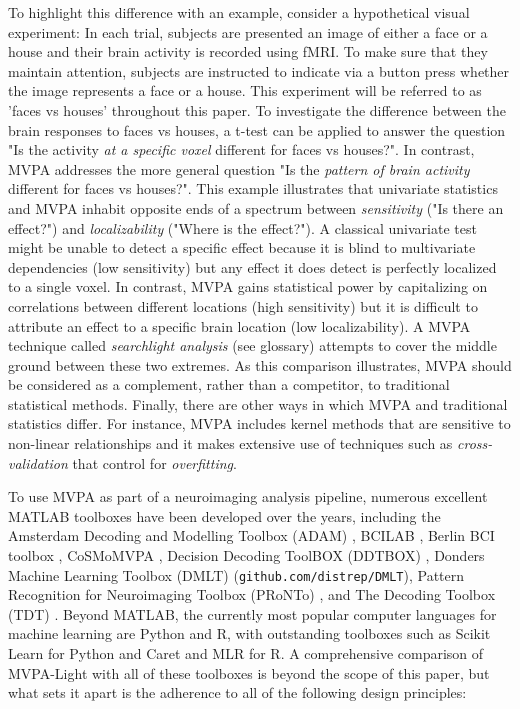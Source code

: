 \documentclass[utf8]{frontiersSCNS} %
\begin{document}
To highlight this difference with an example, consider a hypothetical visual experiment: In each trial, subjects are presented an image of either a face or a house and their brain activity is recorded using fMRI. To make sure that they maintain attention, subjects are instructed to indicate via a button press whether the image represents a face or a house. This experiment will be referred to as 'faces vs houses' throughout this paper.
To investigate the difference between the brain responses to faces vs houses, a t-test can be applied to answer the question "Is the activity \textit{at a specific voxel} different for faces vs houses?". In contrast, MVPA addresses the more general question "Is the \textit{pattern of brain activity} different for faces vs houses?". This example illustrates that univariate statistics and MVPA inhabit opposite ends of a spectrum between \textit{sensitivity} ("Is there an effect?") and \textit{localizability} ("Where is the effect?"). A classical univariate test might be unable to detect a specific effect because it is blind to multivariate dependencies (low sensitivity) but any effect it does detect is perfectly localized to a single voxel. In contrast, MVPA gains statistical power by capitalizing on correlations between different locations (high sensitivity) but it is difficult to attribute an effect to a specific brain location (low localizability). A MVPA technique called \textit{searchlight analysis} (see glossary) attempts to cover the middle ground between these two extremes. As this comparison illustrates, MVPA should be considered as a complement, rather than a competitor, to traditional statistical methods. Finally, there are other ways in which MVPA and traditional statistics differ. For instance, MVPA includes kernel methods that are sensitive to non-linear relationships and it makes extensive use of techniques such as \textit{cross-validation} that control for \textit{overfitting}.

To use MVPA as part of a neuroimaging analysis pipeline, numerous excellent MATLAB toolboxes have been developed over the years, including the Amsterdam Decoding and Modelling Toolbox (ADAM) \citep{Fahrenfort2018FromADAM}, BCILAB \citep{Kothe2013BCILAB:Development}, Berlin BCI toolbox \citep{Blankertz2016TheControl}, CoSMoMVPA \citep{Oosterhof2016CoSMoMVPA:Octave}, Decision Decoding ToolBOX (DDTBOX) \citep{Bode2019ThePotentials}, Donders Machine Learning Toolbox (DMLT) (\texttt{github.com/distrep/DMLT}), Pattern Recognition for Neuroimaging Toolbox (PRoNTo) \citep{Schrouff2013PRoNTo:Toolbox}, and The Decoding Toolbox (TDT) \citep{Hebart2015TheData}. Beyond MATLAB, the currently most popular computer languages for machine learning are Python and R, with outstanding toolboxes such as Scikit Learn \citep{Pedregosa2011Scikit-learn:Python} for Python and Caret \citep{Kuhn2008BuildingPackage} and MLR \citep{Bischl2000Mlr:R} for R. A comprehensive comparison of MVPA-Light with all of these toolboxes is beyond the scope of this paper, but what sets it apart is the adherence to all of the following design principles:
\end{document}
